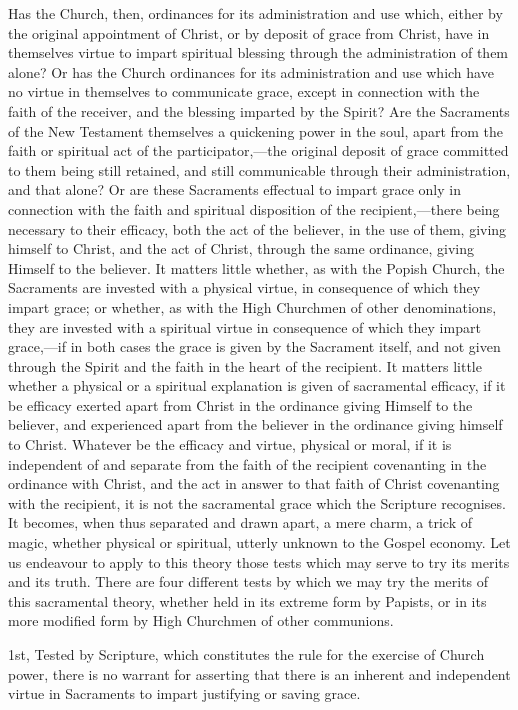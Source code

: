\documentclass[]{book}
\begin{document}
Has the Church, then, ordinances for its administration and use which, either by the original appointment of Christ, or by deposit of grace from Christ, have in themselves virtue to impart spiritual blessing through the administration of them alone? Or has the Church ordinances for its administration and use which have no virtue in themselves to communicate grace, except in connection with the faith of the receiver, and the blessing imparted by the Spirit? Are the Sacraments of the New Testament themselves a quickening power in the soul, apart from the faith or spiritual act of the participator,---the original deposit of grace committed to them being still retained, and still communicable through their administration, and that alone? Or are these Sacraments effectual to impart grace only in connection with the faith and spiritual disposition of the recipient,---there being necessary to their efficacy, both the act of the believer, in the use of them, giving himself to Christ, and the act of Christ, through the same ordinance, giving Himself to the believer. It matters little whether, as with the Popish Church, the Sacraments are invested with a physical virtue, in consequence of which they impart grace; or whether, as with the High Churchmen of other denominations, they are invested with a spiritual virtue in consequence of which they impart grace,---if in both cases the grace is given by the Sacrament itself, and not given through the Spirit and the faith in the heart of the recipient. It matters little whether a physical or a spiritual explanation is given of sacramental efficacy, if it be efficacy exerted apart from Christ in the ordinance giving Himself to the believer, and experienced apart from the believer in the ordinance giving himself to Christ. Whatever be the efficacy and virtue, physical or moral, if it is independent of and separate from the faith of the recipient covenanting in the ordinance with Christ, and the act in answer to that faith of Christ covenanting with the recipient, it is not the sacramental grace which the Scripture recognises. It becomes, when thus separated and drawn apart, a mere charm, a trick of magic, whether physical or spiritual, utterly unknown to the Gospel economy. Let us endeavour to apply to this theory those tests which may serve to try its merits and its truth. There are four different tests by which we may try the merits of this sacramental theory, whether held in its extreme form by Papists, or in its more modified form by High Churchmen of other communions.

1st, Tested by Scripture, which constitutes the rule for the exercise of Church power, there is no warrant for asserting that there is an inherent and independent virtue in Sacraments to impart justifying or saving grace.
\end{document}
